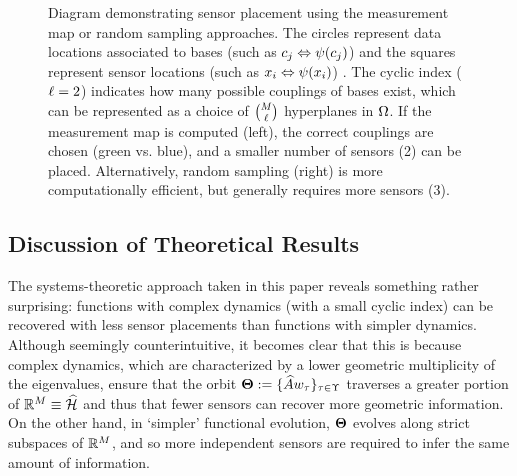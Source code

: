 \begin{figure*}[ht!]
\begin{minipage}{\textwidth}
\begin{minipage}{0.47\textwidth}
  \end{minipage} 
  \end{minipage} 
  \caption{
  Diagram demonstrating sensor placement using the measurement map or random sampling approaches. 
  The circles represent data locations associated to bases (such as $c_j\Leftrightarrow\psi(c_j)$) 
  and the squares represent sensor locations (such as $x_i\Leftrightarrow\psi(x_i)$) .
  The cyclic index ($\ell=2$) indicates how many possible couplings of bases exist, 
  which can be represented 
  as a choice of $\binom{M}{\ell}$ hyperplanes in $\Omega$. If the measurement map is 
  computed (left), the correct couplings are chosen (green vs. blue), and a smaller number of sensors (2) can be placed.
  Alternatively, random sampling (right) is more computationally efficient, but generally
  requires more sensors (3). 
  }\label{fig:sensplace}
\end{figure*}



\subsection{Discussion of Theoretical Results}\label{sec:discussion}
The systems-theoretic approach taken in this paper reveals something rather surprising: functions with complex dynamics (with a small cyclic index) can be recovered with less sensor placements than functions with simpler dynamics. Although seemingly counterintuitive, it becomes clear that this is because complex dynamics, which are characterized by a lower geometric multiplicity of the eigenvalues, ensure that the orbit $\boldsymbol{\Theta} := \{\widehat{A}w_{\tau}\}_{\tau\in\Upsilon}$ traverses a greater portion of $\mathbb{R}^{M} \equiv \widehat{\mathcal{H}}$ and thus that fewer sensors can recover more geometric information. On the other hand, in `simpler' functional evolution, $\boldsymbol{\Theta}$ evolves along strict subspaces of $\mathbb{R}^{M}$, and so more independent sensors are required to infer the same amount of information. 

